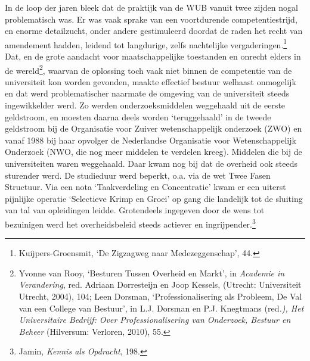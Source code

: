 \documentclass[smallauthor, chapterhaspagenum, nochapterinheader, pagenuminheader,  bigchapnum,medium2, tocpages,  garamond, titleinheader]{jote-book}
\begin{document}
	In de loop der jaren bleek dat de praktijk van de WUB vanuit twee zijden nogal problematisch was. Er was vaak sprake van een voortdurende competentiestrijd, en enorme detailzucht, onder andere gestimuleerd doordat de raden het recht van amendement hadden, leidend tot langdurige, zelfs nachtelijke vergaderingen.\footnote{Kuijpers-Groensmit, ‘De Zigzagweg naar Medezeggenschap', 44.} Dat, en de grote aandacht voor maatschappelijke toestanden en onrecht elders in de wereld\footnote{Yvonne van Rooy, ‘Besturen Tussen Overheid en Markt', in \emph{Academie in Verandering}, red. Adriaan Dorresteijn en Joop Kessels, (Utrecht: Universiteit Utrecht, 2004), 104; Leen Dorsman, ‘Professionalisering als Probleem, De Val van een College van Bestuur', in L.J. Dorsman en P.J. Knegtmans (red\emph{.), Het Universitaire Bedrijf: Over Professionalisering van Onderzoek, Bestuur en Beheer} (Hilversum: Verloren, 2010), 55.}, waarvan de oplossing toch vaak niet binnen de competentie van de universiteit kon worden gevonden, maakte effectief bestuur welhaast onmogelijk en dat werd problematischer naarmate de omgeving van de universiteit steeds ingewikkelder werd. Zo werden onderzoeksmiddelen weggehaald uit de eerste geldstroom, en moesten daarna deels worden ‘teruggehaald' in de tweede geldstroom bij de Organisatie voor Zuiver wetenschappelijk onderzoek (ZWO) en vanaf 1988 bij haar opvolger de Nederlandse Organisatie voor Wetenschappelijk Onderzoek (NWO, die nog meer middelen te verdelen kreeg). Middelen die bij de universiteiten waren weggehaald. Daar kwam nog bij dat de overheid ook steeds sturender werd. De studieduur werd beperkt, o.a. via de wet Twee Fasen Structuur. Via een nota ‘Taakverdeling en Concentratie' kwam er een uiterst pijnlijke operatie ‘Selectieve Krimp en Groei' op gang die landelijk tot de sluiting van tal van opleidingen leidde. Grotendeels ingegeven door de wens tot bezuinigen werd het overheidsbeleid steeds actiever en ingrijpender.\footnote{Jamin, \emph{Kennis als Opdracht}, 198.}
\end{document}
